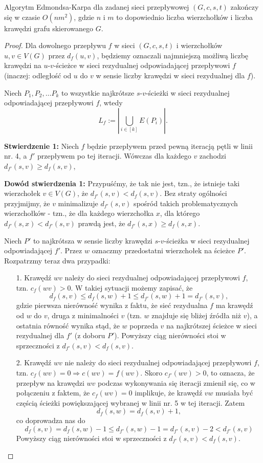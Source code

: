 \begin{theorem}
	Algorytm Edmondsa-Karpa dla zadanej sieci przepływowej $(G, c, s, t)$
	zakończy się w czasie $O(nm^2)$, gdzie $n$ i $m$ to dopowiednio
	liczba wierzchołków i liczba krawędzi grafu skierowanego $G$.
	\begin{proof}
		Dla dowolnego przepływu $f$ w sieci $(G, c, s, t)$ i wierzchołków
		$u, v \in V(G)$ przez $d_f(u, v)$, będziemy oznaczali najmniejszą
		możliwą liczbę krawędzi na $u$-$v$-ścieżce w sieci 
		rezydualnej odpowiadającej przepływowi $f$ (inaczej: odległość
		od $u$ do $v$ w sensie liczby krawędzi w sieci rezydualnej dla $f$).
		
		Niech $P_1, P_2, \dots P_k$ to wszystkie najkrótsze
		$s$-$v$-ścieżki w sieci rezydualnej odpowiadającej przepływowi
		$f$, wtedy 
		\[L_f := |\bigcup_{i \in [k]} E(P_i)|.\]
		
		\textbf{Stwierdzenie 1:} Niech $f$ będzie przepływem przed
		pewną iteracją pętli w linii nr. 4, a $f'$ przepływem 
		po tej iteracji. Wówczas
		dla każdego $v$ zachodzi $d_{f'}(s, v) \geq d_{f}(s,v)$,
		
		\textbf{Dowód stwierdzenia 1:}
		Przypuśćmy, że tak nie jest, tzn., że istnieje 
		taki wierzchołek $v \in V(G)$, że $d_{f'}(s, v) < d_f(s,v)$.
		Bez straty ogólności przyjmijmy, że $v$
		minimalizuje $d_{f'}(s,v)$ spośród takich problematycznych 
		wierzchołków - tzn., że dla każdego wierzchołka $x$, dla 
		którego $d_{f'}(s, x) < d_{f'}(s, v)$ prawdą jest, że 
		$d_{f'}(s, x) \geq d_f(s,x)$.
		
		Niech $P'$ to najkrótsza w sensie liczby krawędzi $s$-$v$-ścieżka
		w sieci rezydualnej odpowiadającej $f'$. Przez $w$ oznaczmy 
		przedostatni wierzchołek na ścieżce $P'$. Rozpatrzmy
		teraz dwa przypadki:
		\begin{itemize}
			\item[1.] Krawędź $wv$ należy do sieci rezydualnej 
			odpowiadającej
			przepływowi $f$, tzn. $c_f(wv) > 0$. W takiej 
			sytuacji możemy zapisać, że  
			\[d_f(s, v) \leq d_f(s, w) + 1 \leq d_{f'}(s, w) + 1 = d_{f'}(s, v),\]
			gdzie pierwsza nierówność wynika z faktu, że sieć rezydualna $f$
			ma krawędź od $w$ do $v$, druga z minimalności $v$ (tzn. 
			$w$ znajduje się bliżej źródła niż $v$), a ostatnia równość
			wynika stąd, że $w$ poprzeda $v$ na najkrótszej ścieżce 
			w sieci rezydualnej dla $f'$ (z doboru $P'$).
			Powyższy ciąg nierówności stoi w sprzeczności z
			$d_{f'}(s, v) < d_f(s,v)$.
			
			\item[2.] Krawędź $wv$ nie należy do sieci rezydualnej 
			odpowiadającej
			przepływowi $f$, tzn. $c_f(wv) = 0 \Rightarrow c(wv) = f(wv)$.
			Skoro  $c_{f'}(wv) > 0$, to oznacza, że przepływ na
			krawędzi $wv$ podczas wykonywania się iteracji zmienił się, 
			co w połączeniu z faktem, że  $c_f(wv) = 0$
			implikuje, że krawędź $vw$ musiała być częścią ścieżki 
			powiększającej wybranej w linii nr. 5 w tej iteracji.
			Zatem 
			\[d_f(s, w) = d_f(s, v) + 1,\]
			co doprowadza nas do 
			\[d_f(s, v) = d_f(s,w) - 1 \leq
			d_{f'}(s,w) -1 = d_{f'}(s,v    ) - 2 < d_{f'}(s,v)\]
			Powyższy ciąg nierówności stoi w sprzeczności z
			$d_{f'}(s, v) < d_f(s,v)$.
		\end{itemize}
		

\end{proof}
\end{theorem}
